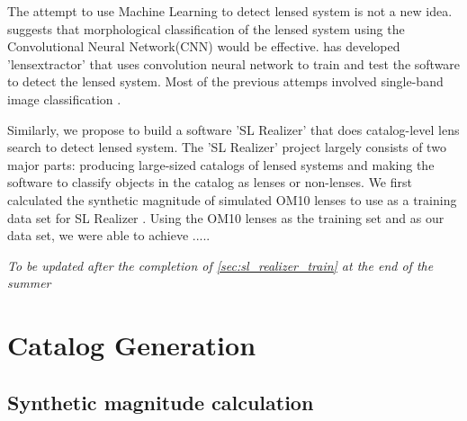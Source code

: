 \documentclass[\docopts]{\docclass}
\begin{document}
The attempt to use Machine Learning to detect lensed system is not a new idea. \citep{convolution_neural_network} suggests that morphological classification of the lensed system using the Convolutional Neural Network(CNN) would be effective. \cite{lensextractor} has developed 'lensextractor' that uses convolution neural network to train and test the software to detect the lensed system. Most of the previous attemps involved single-band image classification \citep{lensextractor} \citep{convolution_neaural_network}.

Similarly, we propose to build a software 'SL Realizer' that does catalog-level lens search to detect lensed system. The 'SL Realizer' project largely consists of two major parts: producing large-sized catalogs of lensed systems and making the software to classify objects in the catalog as lenses or non-lenses. We first calculated the synthetic magnitude of simulated OM10 lenses to use as a training data set for SL Realizer \citep{OM10}. Using the OM10 lenses as the training set and \citep{Twinkles} as our data set, we were able to achieve ..... 

\textit{To be updated after the completion of \ref{sec:sl_realizer_train} at the end of the summer}






\section{Catalog Generation}
\subsection{Synthetic magnitude calculation}
\label{sssec:Synthetic}
\end{document}
